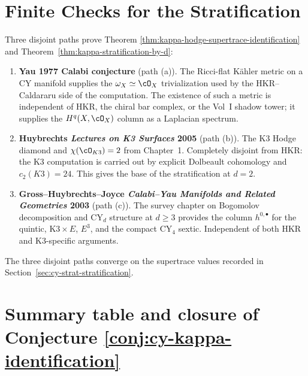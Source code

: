 \section{Finite Checks for the Stratification}
\label{sec:cy-strat-finite-checks}

Three disjoint paths prove Theorem
\ref{thm:kappa-hodge-supertrace-identification} and
Theorem~\ref{thm:kappa-stratification-by-d}:

\begin{enumerate}
\item \textbf{Yau 1977 Calabi conjecture} (path (a)). The Ricci-flat
K\"ahler metric on a CY manifold supplies the $\omega_X \simeq \cO_X$
trivialization used by the HKR--Caldararu side of the computation. The
existence of such a metric is independent of HKR, the chiral bar
complex, or the Vol~I shadow tower; it supplies the $H^q(X, \cO_X)$
column as a Laplacian spectrum.
\item \textbf{Huybrechts \emph{Lectures on K3 Surfaces} 2005} (path
(b)). The K3 Hodge diamond and $\chi(\cO_{K3}) = 2$ from Chapter~1.
Completely disjoint from HKR: the K3 computation is carried out by
explicit Dolbeault cohomology and $c_2(K3) = 24$. This gives the
base of the stratification at $d = 2$.
\item \textbf{Gross--Huybrechts--Joyce \emph{Calabi--Yau Manifolds and
Related Geometries} 2003} (path (c)). The survey chapter on
Bogomolov decomposition and CY$_d$ structure at $d \geq 3$ provides
the column $h^{0,\bullet}$ for the quintic, $\mathrm{K3} \times E$,
$E^3$, and the compact CY$_4$ sextic. Independent of both HKR and
K3-specific arguments.
\end{enumerate}

The three disjoint paths converge on the supertrace values recorded in
Section~\ref{sec:cy-strat-stratification}.

\section{Summary table and closure of Conjecture
\ref{conj:cy-kappa-identification}}
\label{sec:cy-strat-summary}

